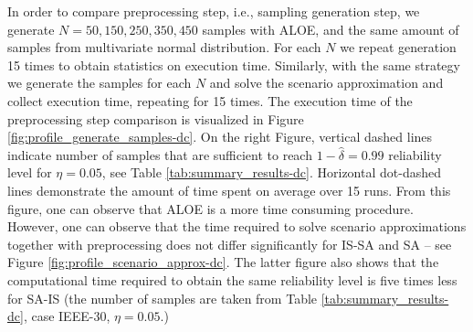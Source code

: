 In order to compare preprocessing step, i.e., sampling generation step, we generate $N=50, 150, 250, 350, 450$ samples with ALOE, and the same amount of samples from multivariate normal distribution. For each $N$ we repeat generation 15 times to obtain statistics on execution time. Similarly, with the same strategy we generate the samples for each $N$ and solve the scenario approximation and collect execution time, repeating for 15 times. 
The execution time of the preprocessing step comparison is visualized in Figure \ref{fig:profile_generate_samples-dc}. On the right Figure, vertical dashed lines indicate number of samples that are sufficient to reach $1-\hat{\delta}=0.99$ reliability level for $\eta=0.05$, see Table \ref{tab:summary_results-dc}. Horizontal dot-dashed lines demonstrate the amount of time spent on average over 15 runs. From this figure, one can observe that ALOE is a more time consuming procedure. However, one can observe that the time required to solve scenario approximations together with preprocessing does not differ significantly for IS-SA and SA -- see Figure \ref{fig:profile_scenario_approx-dc}. The latter figure also shows that the computational time required to obtain the same reliability level is five times less for SA-IS (the number of samples are taken from Table \ref{tab:summary_results-dc}, case IEEE-30, $\eta=0.05$.)

